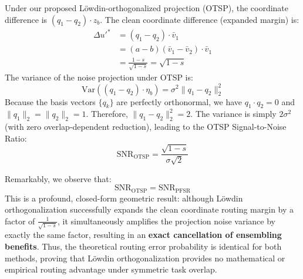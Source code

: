Under our proposed L{\"o}wdin-orthogonalized projection (OTSP), the coordinate difference is $(q_1 - q_2) \cdot z_b$. The clean coordinate difference (expanded margin) is:
\begin{equation}
\begin{aligned}
\Delta u'^* &= (q_1 - q_2) \cdot \bar{v}_1 \\
&= (a - b)(\bar{v}_1 - \bar{v}_2) \cdot \bar{v}_1 \\
&= \frac{1-s}{\sqrt{1-s}} = \sqrt{1-s}
\end{aligned}
\end{equation}
The variance of the noise projection under OTSP is:
\begin{equation}
\text{Var}((q_1 - q_2) \cdot \eta_b) = \sigma^2 \|q_1 - q_2\|_2^2
\end{equation}
Because the basis vectors $\{q_k\}$ are perfectly orthonormal, we have $q_1 \cdot q_2 = 0$ and $\|q_1\|_2 = \|q_2\|_2 = 1$. Therefore, $\|q_1 - q_2\|_2^2 = 2$.
The variance is simply $2 \sigma^2$ (with zero overlap-dependent reduction), leading to the OTSP Signal-to-Noise Ratio:
\begin{equation}
\text{SNR}_{\text{OTSP}} = \frac{\sqrt{1-s}}{\sigma \sqrt{2}}
\end{equation}

Remarkably, we observe that:
\begin{equation}
\text{SNR}_{\text{OTSP}} = \text{SNR}_{\text{PFSR}}
\end{equation}
This is a profound, closed-form geometric result: although Löwdin orthogonalization successfully expands the clean coordinate routing margin by a factor of $\frac{1}{\sqrt{1-s}}$, it simultaneously amplifies the projection noise variance by exactly the same factor, resulting in an \textbf{exact cancellation of ensembling benefits}. Thus, the theoretical routing error probability is identical for both methods, proving that Löwdin orthogonalization provides no mathematical or empirical routing advantage under symmetric task overlap.
